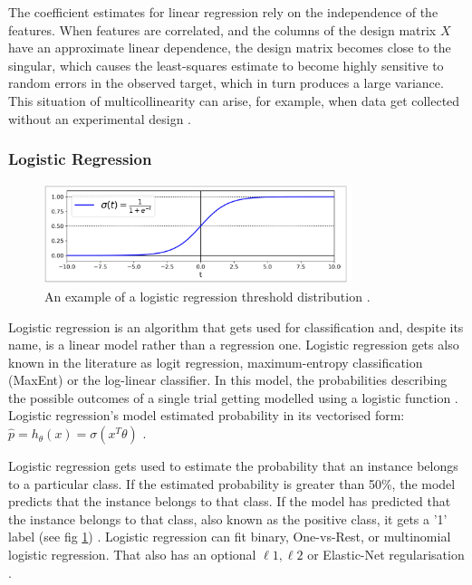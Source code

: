 	The coefficient estimates for linear regression rely on the independence of the features. When features are correlated, and the columns of the design matrix $X$ have an approximate linear dependence, the design matrix becomes close to the singular, which causes the least-squares estimate to become highly sensitive to random errors in the observed target, which in turn produces a large variance. This situation of multicollinearity can arise, for example, when data get collected without an experimental design \cite{sklearn_lr, geron2019hands}.
	
	\subsubsection{Logistic Regression}
	\begin{figure}[t]
		\begin{center}
			\includegraphics[width=9cm]{graphics/logistic_reg.jpeg}
			\caption{An example of a logistic regression threshold distribution \cite{geron2019hands}.}
			\label{fig:logr_example}
		\end{center}
		
	\end{figure}
	Logistic regression is an algorithm that gets used for classification and, despite its name, is a linear model rather than a regression one. Logistic regression gets also known in the literature as logit regression, maximum-entropy classification (MaxEnt) or the log-linear classifier. In this model, the probabilities describing the possible outcomes of a single trial getting modelled using a logistic function \cite{sklearn_lr, handson_book}. Logistic regression's model estimated probability in its vectorised form: $\hat{p}=h_\theta(x) = \sigma(x^T\theta)$ \cite{geron2019hands}.
	
	Logistic regression gets used to estimate the probability that an instance belongs to a particular class. If the estimated probability is greater than 50\%, the model predicts that the instance belongs to that class. If the model has predicted that the instance belongs to that class, also known as the positive class, it gets a '1' label  (see fig \ref{fig:logr_example}) \cite{handson_book, geron2019hands}. Logistic regression can fit binary, One-vs-Rest, or multinomial logistic regression. That also has an optional $\ell1, \ell2$ or Elastic-Net regularisation \cite{sklearn_lr}.
	

